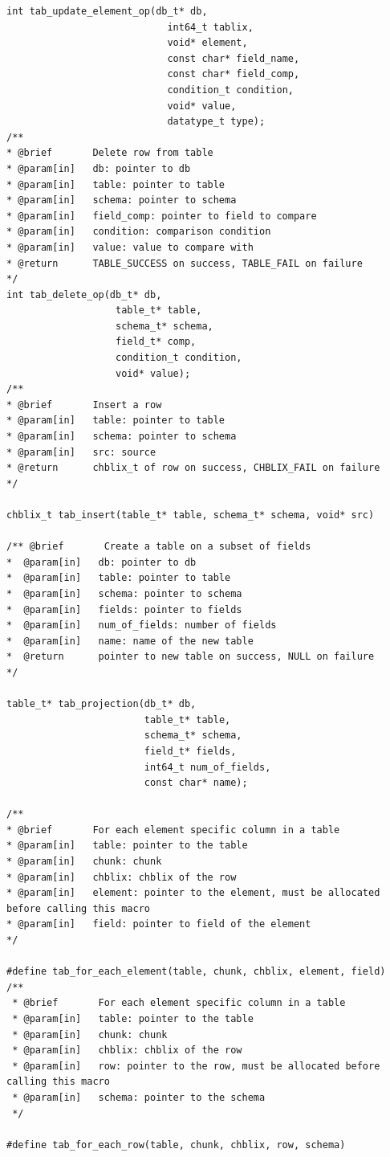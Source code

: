 \documentclass[12pt,onecolumn]{article}
\begin{document}
\begin{lstlisting}[style=C]
int tab_update_element_op(db_t* db,
                            int64_t tablix,
                            void* element,
                            const char* field_name,
                            const char* field_comp,
                            condition_t condition,
                            void* value,
                            datatype_t type);
/**
* @brief       Delete row from table
* @param[in]   db: pointer to db
* @param[in]   table: pointer to table
* @param[in]   schema: pointer to schema
* @param[in]   field_comp: pointer to field to compare
* @param[in]   condition: comparison condition
* @param[in]   value: value to compare with
* @return      TABLE_SUCCESS on success, TABLE_FAIL on failure
*/                          
int tab_delete_op(db_t* db,
                   table_t* table,
                   schema_t* schema,
                   field_t* comp,
                   condition_t condition,
                   void* value);
/**
* @brief       Insert a row
* @param[in]   table: pointer to table
* @param[in]   schema: pointer to schema
* @param[in]   src: source
* @return      chblix_t of row on success, CHBLIX_FAIL on failure
*/

chblix_t tab_insert(table_t* table, schema_t* schema, void* src)

/** @brief       Create a table on a subset of fields
*  @param[in]   db: pointer to db
*  @param[in]   table: pointer to table
*  @param[in]   schema: pointer to schema
*  @param[in]   fields: pointer to fields
*  @param[in]   num_of_fields: number of fields
*  @param[in]   name: name of the new table
*  @return      pointer to new table on success, NULL on failure
*/

table_t* tab_projection(db_t* db,
                        table_t* table,
                        schema_t* schema,
                        field_t* fields,
                        int64_t num_of_fields,
                        const char* name);

/**
* @brief       For each element specific column in a table
* @param[in]   table: pointer to the table
* @param[in]   chunk: chunk
* @param[in]   chblix: chblix of the row
* @param[in]   element: pointer to the element, must be allocated before calling this macro
* @param[in]   field: pointer to field of the element
*/

#define tab_for_each_element(table, chunk, chblix, element, field)
/**
 * @brief       For each element specific column in a table
 * @param[in]   table: pointer to the table
 * @param[in]   chunk: chunk
 * @param[in]   chblix: chblix of the row
 * @param[in]   row: pointer to the row, must be allocated before calling this macro
 * @param[in]   schema: pointer to the schema
 */

#define tab_for_each_row(table, chunk, chblix, row, schema)
\end{lstlisting}
\end{document}
